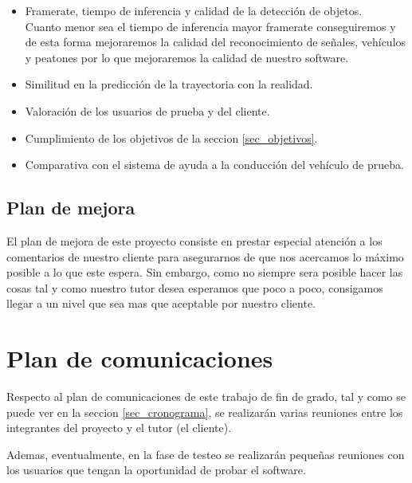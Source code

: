 \begin{itemize}
  \item Framerate, tiempo de inferencia y calidad de la detección de objetos.\\
    Cuanto menor sea el tiempo de inferencia mayor framerate conseguiremos y de esta forma mejoraremos la calidad del reconocimiento de señales, vehículos y peatones por lo que mejoraremos la calidad de nuestro software.
  \item Similitud en la predicción de la trayectoria con la realidad.
  \item Valoración de los usuarios de prueba y del cliente.
  \item Cumplimiento de los objetivos de la seccion \ref{sec_objetivos}.
  \item Comparativa con el sistema de ayuda a la conducción del vehículo de prueba.
\end{itemize}


\subsection{Plan de mejora}
El plan de mejora de este proyecto consiste en prestar especial atención a los comentarios de nuestro cliente para asegurarnos de que nos acercamos lo máximo posible a lo que este espera.
Sin embargo, como no siempre sera posible hacer las cosas tal y como nuestro tutor desea esperamos que poco a poco, consigamos llegar a un nivel que sea mas que aceptable por nuestro cliente.

\section{Plan de comunicaciones}
Respecto al plan de comunicaciones de este trabajo de fin de grado, tal y como se puede ver en la seccion \ref{sec_cronograma}, se realizarán varias reuniones entre los integrantes del proyecto y el tutor (el cliente).

Ademas, eventualmente, en la fase de testeo se realizarán pequeñas reuniones con los usuarios que tengan la oportunidad de probar el software.
